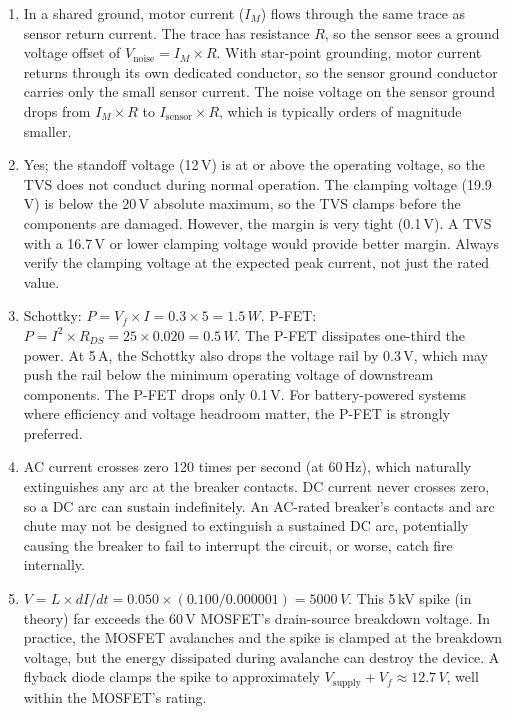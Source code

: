\begin{enumerate}[leftmargin=1.5em]
  \item In a shared ground, motor current ($I_M$) flows through the same trace as sensor return current. The trace has resistance $R$, so the sensor sees a ground voltage offset of $V_{\text{noise}} = I_M \times R$. With star-point grounding, motor current returns through its own dedicated conductor, so the sensor ground conductor carries only the small sensor current. The noise voltage on the sensor ground drops from $I_M \times R$ to $I_{\text{sensor}} \times R$, which is typically orders of magnitude smaller.

  \item Yes; the standoff voltage (12\,V) is at or above the operating voltage, so the TVS does not conduct during normal operation. The clamping voltage (19.9\,V) is below the 20\,V absolute maximum, so the TVS clamps before the components are damaged. However, the margin is very tight (0.1\,V). A TVS with a 16.7\,V or lower clamping voltage would provide better margin. Always verify the clamping voltage at the expected peak current, not just the rated value.

  \item Schottky: $P = V_f \times I = 0.3 \times 5 = 1.5\,W$. P-FET: $P = I^2 \times R_{DS} = 25 \times 0.020 = 0.5\,W$. The P-FET dissipates one-third the power. At 5\,A, the Schottky also drops the voltage rail by 0.3\,V, which may push the rail below the minimum operating voltage of downstream components. The P-FET drops only 0.1\,V. For battery-powered systems where efficiency and voltage headroom matter, the P-FET is strongly preferred.

  \item AC current crosses zero 120 times per second (at 60\,Hz), which naturally extinguishes any arc at the breaker contacts. DC current never crosses zero, so a DC arc can sustain indefinitely. An AC-rated breaker's contacts and arc chute may not be designed to extinguish a sustained DC arc, potentially causing the breaker to fail to interrupt the circuit, or worse, catch fire internally.

  \item $V = L \times dI/dt = 0.050 \times (0.100 / 0.000001) = 5000\,V$. This 5\,kV spike (in theory) far exceeds the 60\,V MOSFET's drain-source breakdown voltage. In practice, the MOSFET avalanches and the spike is clamped at the breakdown voltage, but the energy dissipated during avalanche can destroy the device. A flyback diode clamps the spike to approximately $V_{\text{supply}} + V_f \approx 12.7\,V$, well within the MOSFET's rating.


\end{enumerate}

